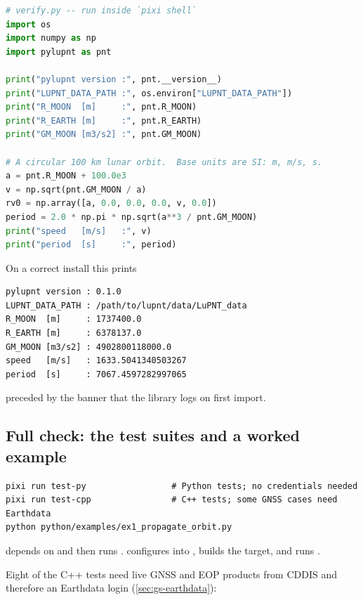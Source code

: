 \begin{lstlisting}[language=py, caption={A minimal install check.}, label={lst:gs-verify}]
# verify.py -- run inside `pixi shell`
import os
import numpy as np
import pylupnt as pnt

print("pylupnt version :", pnt.__version__)
print("LUPNT_DATA_PATH :", os.environ["LUPNT_DATA_PATH"])
print("R_MOON  [m]     :", pnt.R_MOON)
print("R_EARTH [m]     :", pnt.R_EARTH)
print("GM_MOON [m3/s2] :", pnt.GM_MOON)

# A circular 100 km lunar orbit.  Base units are SI: m, m/s, s.
a = pnt.R_MOON + 100.0e3
v = np.sqrt(pnt.GM_MOON / a)
rv0 = np.array([a, 0.0, 0.0, 0.0, v, 0.0])
period = 2.0 * np.pi * np.sqrt(a**3 / pnt.GM_MOON)
print("speed   [m/s]   :", v)
print("period  [s]     :", period)
\end{lstlisting}

On a correct install this prints

\begin{lstlisting}[language=shell]
pylupnt version : 0.1.0
LUPNT_DATA_PATH : /path/to/lupnt/data/LuPNT_data
R_MOON  [m]     : 1737400.0
R_EARTH [m]     : 6378137.0
GM_MOON [m3/s2] : 4902800118000.0
speed   [m/s]   : 1633.5041340503267
period  [s]     : 7067.4597282997065
\end{lstlisting}

preceded by the  banner that the library logs on
first import.

\subsection{Full check: the test suites and a worked example}

\begin{lstlisting}[language=shell]
pixi run test-py                 # Python tests; no credentials needed
pixi run test-cpp                # C++ tests; some GNSS cases need Earthdata
python python/examples/ex1_propagate_orbit.py
\end{lstlisting}

 depends on  and then runs
.  configures
 into , builds the
 target, and runs .

Eight of the C++ tests need live GNSS and EOP products from CDDIS and
therefore an Earthdata login (\cref{sec:gs-earthdata}):

